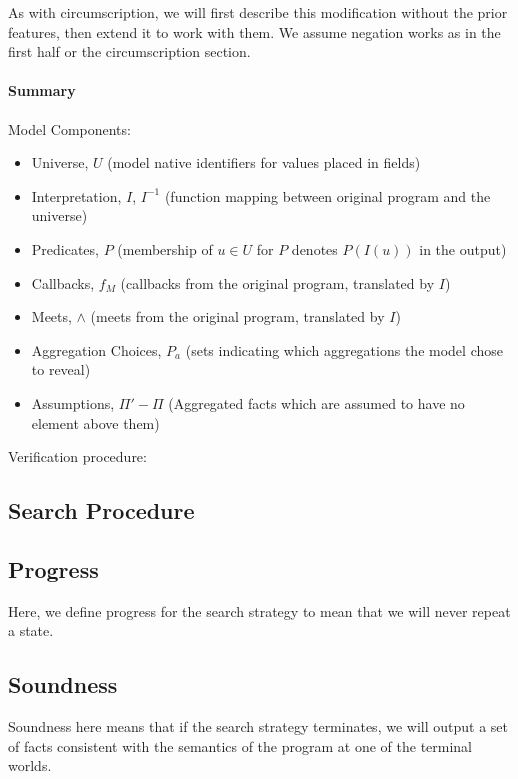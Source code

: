 As with circumscription, we will first describe this modification without the prior features, then extend it to work with them.
We assume negation works as in the first half or the circumscription section.

\paragraph{Summary}
Model Components:
\begin{itemize}
	\item Universe, $U$ (model native identifiers for values placed in fields)
	\item Interpretation, $I$, $I^{-1}$ (function mapping between original program and the universe)
	\item Predicates, $P$ (membership of $u \in U$ for $P$ denotes $P(I(u))$ in the output)
	\item Callbacks, $f_M$ (callbacks from the original program, translated by $I$)
	\item Meets, $\wedge$ (meets from the original program, translated by $I$)
	\item Aggregation Choices, $P_a$ (sets indicating which aggregations the model chose to reveal)
	\item Assumptions, $\Pi' - \Pi$ (Aggregated facts which are assumed to have no element above them)
\end{itemize}
Verification procedure:

\subsection{Search Procedure}
\label{sec:search}
\subsection{Progress}
\label{sec:progress}
Here, we define progress for the search strategy to mean that we will never repeat a state.
\subsection{Soundness}
\label{sec:soundness}
Soundness here means that if the search strategy terminates, we will output a set of facts consistent with the semantics of the program at one of the terminal worlds.
